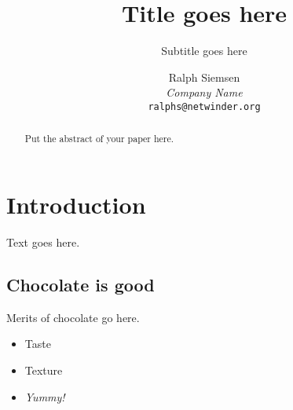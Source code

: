 \documentclass[final]{ols}
\begin{document}
%
%
\title{Title goes here}
\subtitle{Subtitle goes here}
\author{
	Ralph Siemsen\\
	{\em Company Name}\\
	{\tt\small ralphs{@}netwinder.org}
}
\date{} %
\maketitle

%
%
\begin{abstract}
Put the abstract of your paper here.
\end{abstract}

%
%
\section{Introduction}
Text goes here.

\subsection{Chocolate is good}
Merits of chocolate go here.

\begin{itemize}
\item Taste
\item Texture
\item \textit{Yummy!}
\end{itemize}

\end{document}
